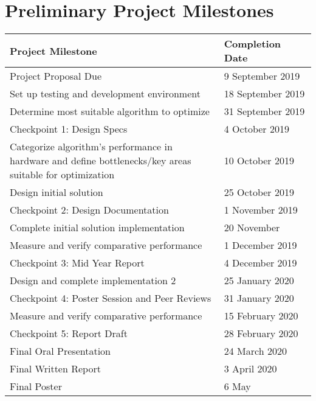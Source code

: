 \documentclass[11pt, oneside]{article}   	%
\begin{document}
\clearpage 

\section{Preliminary Project Milestones}

\begin{center}
\begin{tabular}{ |m{0.7\linewidth}|m{0.3\linewidth}|}
    \hline
    \textbf{Project Milestone}                                      & \textbf{Completion Date} \\
    \hline
    Project Proposal Due                                            & 9 September 2019 \\
    \hline
    Set up testing and development environment                      & 18 September 2019 \\
    \hline
    Determine most suitable algorithm to optimize                   & 31 September 2019 \\
    \hline
    Checkpoint 1: Design Specs                                      & 4 October 2019 \\
    \hline
    Categorize algorithm’s performance in hardware and define bottlenecks/key areas suitable for optimization & 10 October 2019 \\
    \hline
    Design initial solution                                         & 25 October 2019 \\
    \hline
    Checkpoint 2: Design Documentation                              & 1 November 2019 \\
    \hline
    Complete initial solution implementation                        & 20 November \\
    \hline
    Measure and verify comparative performance                      & 1 December 2019 \\
    \hline
    Checkpoint 3: Mid Year Report                                   & 4 December 2019 \\
    \hline
    Design and complete implementation 2                            & 25 January 2020 \\
    \hline
    Checkpoint 4: Poster Session and Peer Reviews                   & 31 January 2020 \\
    \hline
    Measure and verify comparative performance                      & 15 February 2020 \\
    \hline
    Checkpoint 5: Report Draft                                      & 28 February 2020 \\
    \hline
    Final Oral Presentation                                         & 24 March 2020 \\
    \hline
    Final Written Report                                            & 3 April 2020 \\
    \hline
    Final Poster                                                    & 6 May \\
    \hline
    
\end{tabular}
\end{center}
\end{document}
